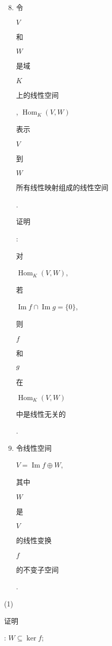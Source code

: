 \documentclass[10pt]{article}
\begin{document}
\begin{enumerate}
  \setcounter{enumi}{7}
  \item \begin{CJK}{UTF8}{mj}令\end{CJK} $V$ \begin{CJK}{UTF8}{mj}和\end{CJK} $W$ \begin{CJK}{UTF8}{mj}是域\end{CJK} $K$ \begin{CJK}{UTF8}{mj}上的线性空间\end{CJK}, $\operatorname{Hom}_{K}(V, W)$ \begin{CJK}{UTF8}{mj}表示\end{CJK} $V$ \begin{CJK}{UTF8}{mj}到\end{CJK} $W$ \begin{CJK}{UTF8}{mj}所有线性映射组成的线性空间\end{CJK}. \begin{CJK}{UTF8}{mj}证明\end{CJK}: \begin{CJK}{UTF8}{mj}对\end{CJK} $\operatorname{Hom}_{K}(V, W)$, \begin{CJK}{UTF8}{mj}若\end{CJK} $\operatorname{Im} f \cap \operatorname{Im} g=\{0\}$, \begin{CJK}{UTF8}{mj}则\end{CJK} $f$ \begin{CJK}{UTF8}{mj}和\end{CJK} $g$ \begin{CJK}{UTF8}{mj}在\end{CJK} $\operatorname{Hom}_{K}(V, W)$ \begin{CJK}{UTF8}{mj}中是线性无关的\end{CJK}.

  \item \begin{CJK}{UTF8}{mj}令线性空间\end{CJK} $V=\operatorname{Im} f \oplus W$, \begin{CJK}{UTF8}{mj}其中\end{CJK} $W$ \begin{CJK}{UTF8}{mj}是\end{CJK} $V$ \begin{CJK}{UTF8}{mj}的线性变换\end{CJK} $f$ \begin{CJK}{UTF8}{mj}的不变子空间\end{CJK}.

\end{enumerate}
(1) \begin{CJK}{UTF8}{mj}证明\end{CJK}: $W \subseteq \operatorname{ker} f$;
\end{document}
